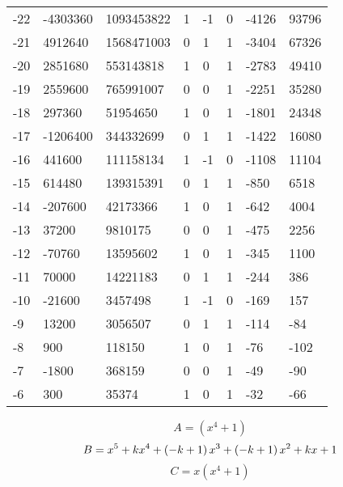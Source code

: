 \documentclass{amsart}
\begin{document}
\begin{longtable}{|l|l|l|lllll|}
-22&-4303360&1093453822&1&-1&0&-4126&93796\\
-21&4912640&1568471003&0&1&1&-3404&67326\\
-20&2851680&553143818&1&0&1&-2783&49410\\
-19&2559600&765991007&0&0&1&-2251&35280\\
-18&297360&51954650&1&0&1&-1801&24348\\
-17&-1206400&344332699&0&1&1&-1422&16080\\
-16&441600&111158134&1&-1&0&-1108&11104\\
-15&614480&139315391&0&1&1&-850&6518\\
-14&-207600&42173366&1&0&1&-642&4004\\
-13&37200&9810175&0&0&1&-475&2256\\
-12&-70760&13595602&1&0&1&-345&1100\\
-11&70000&14221183&0&1&1&-244&386\\
-10&-21600&3457498&1&-1&0&-169&157\\
-9&13200&3056507&0&1&1&-114&-84\\
-8&900&118150&1&0&1&-76&-102\\
-7&-1800&368159&0&0&1&-49&-90\\
-6&300&35374&1&0&1&-32&-66\\
\hline
\end{longtable}
$$A=(x^4
 + 1)$$
$$B=x^5
 + k\*x^4
 + \left(-k
 + 1\right) \*x^3
 + \left(-k
 + 1\right) \*x^2
 + k\*x
 + 1$$
$$C=x(x^4
 + 1)$$
\end{document}
